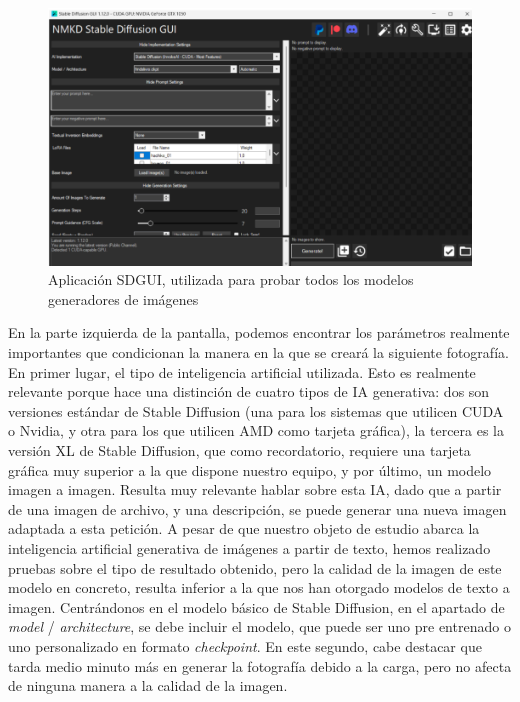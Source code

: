  
 \begin{figure}[h]
 	\centering
 	\includegraphics[width = 1
 	\textwidth]{Imagenes/Vectorial/nmkdsdgui.png}
 	\caption{Aplicación SDGUI, utilizada para probar todos los modelos generadores de imágenes }
 	\label{fig:nmkdsdgui}
 \end{figure}
 
 En la parte izquierda de la pantalla, podemos encontrar los parámetros realmente importantes que condicionan la manera en la que se creará la siguiente fotografía. En primer lugar, el tipo de inteligencia artificial utilizada. Esto es realmente relevante porque hace una distinción de cuatro tipos de IA generativa: dos son versiones estándar de Stable Diffusion (una para los sistemas que utilicen CUDA o Nvidia, y otra para los que utilicen AMD como tarjeta gráfica), la tercera es la versión XL de Stable Diffusion, que como recordatorio, requiere una tarjeta gráfica muy superior a la que dispone nuestro equipo, y por último, un modelo imagen a imagen. Resulta muy relevante hablar sobre esta IA, dado que a partir de una imagen de archivo, y una descripción, se puede generar una nueva imagen adaptada a esta petición. A pesar de que nuestro objeto de estudio abarca la inteligencia artificial generativa de imágenes a partir de texto, hemos realizado pruebas sobre el tipo de resultado obtenido, pero la calidad de la imagen de este modelo en concreto, resulta inferior a la que nos han otorgado modelos de texto a imagen. Centrándonos en el modelo básico de Stable Diffusion, en el apartado de \textit{model} / \textit{architecture}, se debe incluir el modelo, que puede ser uno pre entrenado o uno personalizado en formato \textit{checkpoint}. En este segundo, cabe destacar que tarda medio minuto más en generar la fotografía debido a la carga, pero no afecta de ninguna manera a la calidad de la imagen. \\
 
